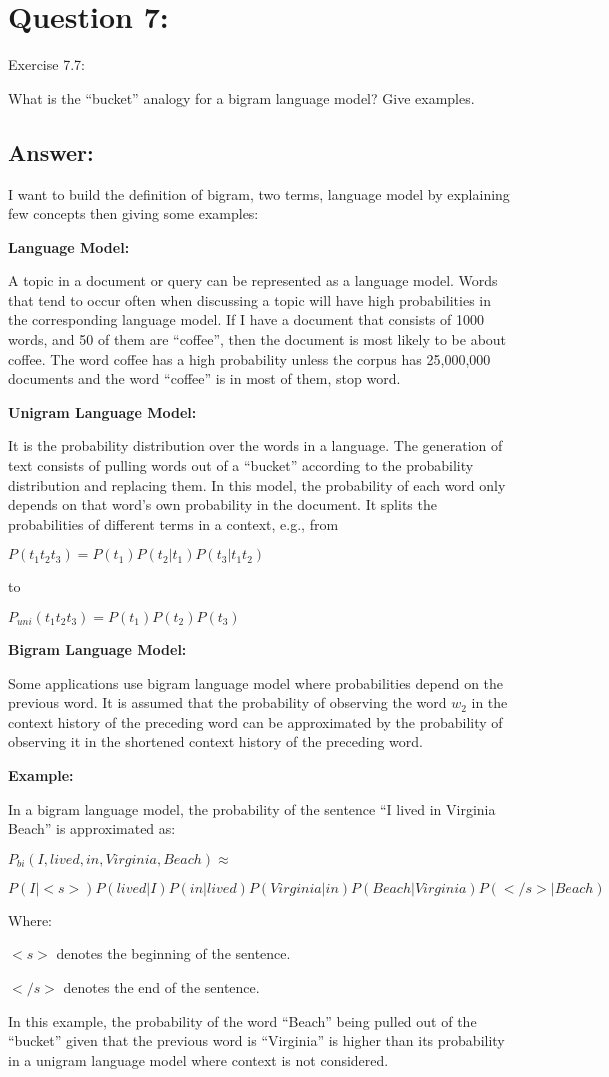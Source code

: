 \section*{Question 7:}
Exercise 7.7: 

What is the ``bucket'' analogy for a bigram language model? Give examples.

\subsection*{Answer:}

I want to build the definition of bigram, two terms, language model by explaining few concepts then giving some examples:
 
\textbf{Language Model:}

A topic in a document or query can be represented as a language model. Words that tend to occur often when discussing a topic will have high probabilities in the corresponding language model. If I have a document that consists of 1000 words, and 50 of them are ``coffee'', then the document is most likely to be about coffee. The word coffee has a high probability unless the corpus has 25,000,000 documents and the word ``coffee'' is in most of them, stop word.

\textbf{Unigram Language Model:}

It is the probability distribution over the words in a language. The generation of text consists of pulling words out of a “bucket” according to the probability distribution and replacing them. In this model, the probability of each word only depends on that word's own probability in the document. It splits the probabilities of different terms in a context, e.g., from

$P(t_1 t_2 t_3) = P(t_1) P(t_2|t_1) P(t_3|t_1 t_2)$

to

$P_{uni}(t_1 t_2 t_3) = P(t_1) P(t_2) P(t_3)$

 

\textbf{Bigram Language Model:}

Some applications use bigram language model where probabilities depend
on the previous word. It is assumed that the probability of observing the word $w_2$ in the context history of the preceding word can be approximated by the probability of observing it in the shortened context history of the preceding word. 

\textbf{Example:}

In a bigram language model, the probability of the sentence ``I lived in Virginia Beach'' is approximated as:

$P_{bi}(I, lived, in, Virginia, Beach) \approx $


$P(I|<s>) P(lived | I) P(in | lived) P(Virginia | in) P(Beach | Virginia) P(</s>|Beach)$

Where:

$<s>$ denotes the beginning of the sentence.

$</s>$ denotes the end of the sentence.

In this example, the probability of the word ``Beach'' being pulled out of the ``bucket'' given that the previous word is ``Virginia'' is higher than its probability in a unigram language model where context is not considered.
